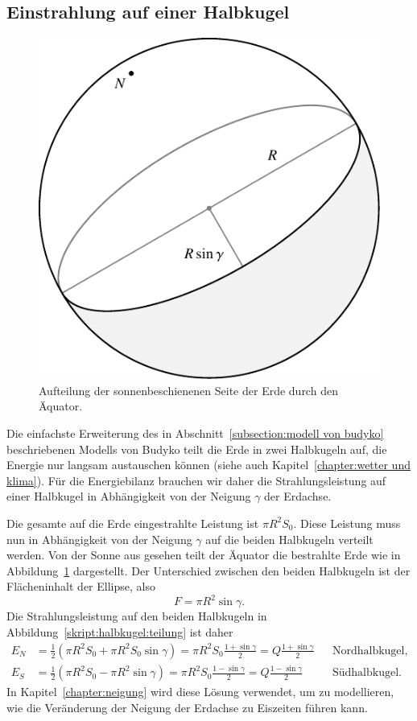 %
%
%
\subsection{Einstrahlung auf einer Halbkugel\label{subsection:halbkugel}}
\begin{figure}
\centering
\includegraphics{chapters/5/halb.pdf}
\caption{Aufteilung der sonnenbeschienenen Seite der Erde durch den
Äquator.
\label{skript:halbkugel:teilung}}
\end{figure}%
Die einfachste Erweiterung des
in Abschnitt~\ref{subsection:modell von budyko} beschriebenen
Modells von Budyko teilt die
Erde in zwei Halbkugeln auf, die Energie nur langsam austauschen
können (siehe auch Kapitel~\ref{chapter:wetter und klima}).
Für die Energiebilanz brauchen wir daher die Strahlungsleistung
auf einer Halbkugel in Abhängigkeit von der Neigung $\gamma$ der
Erdachse.

Die gesamte auf die Erde eingestrahlte Leistung ist $\pi R^2S_0$.
Diese Leistung muss nun in Abhängigkeit von der Neigung $\gamma$
auf die beiden Halbkugeln verteilt werden.
Von der Sonne aus gesehen teilt der Äquator die bestrahlte Erde wie
in Abbildung~\ref{skript:halbkugel:teilung} dargestellt.
Der Unterschied zwischen den beiden Halbkugeln ist der Flächeninhalt
der Ellipse, also
\[
F=\pi R^2\sin\gamma.
\]
Die Strahlungsleistung auf den beiden Halbkugeln in
Abbildung~\eqref{skript:halbkugel:teilung} ist daher
\begin{align}
E_N
&= 
\frac12(\pi R^2 S_0 +\pi R^2S_0\sin\gamma)
=
\pi R^2S_0 \frac{1+\sin\gamma}2 = Q\frac{1+\sin\gamma}2
&&\text{Nordhalbkugel,}
\\
E_S
&= 
\frac12(\pi R^2 S_0 -\pi R^2\sin\gamma)
=
\pi R^2S_0 \frac{1-\sin\gamma}2 = Q\frac{1-\sin\gamma}2
&&\text{Südhalbkugel.}
\end{align}
In Kapitel~\ref{chapter:neigung} wird diese Lösung verwendet, um zu
modellieren, wie die Veränderung der Neigung der Erdachse zu Eiszeiten
führen kann.




